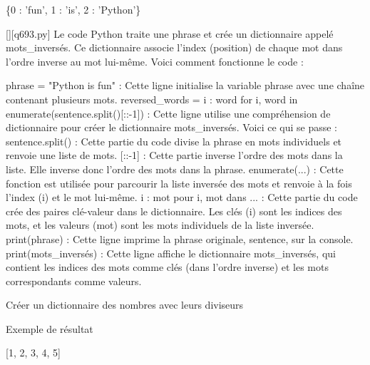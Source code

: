\{0 : 'fun', 1 : 'is', 2 : 'Python'\}
        \par
        \begin{solution}
            \renewcommand{\nomfichier}{q693.py}
            \pythonfile{\chemincode \nomfichier}[][\nomfichier]
            Le code Python traite une phrase et crée un dictionnaire appelé mots_inversés. Ce dictionnaire associe l'index (position) de chaque mot dans l'ordre inverse au mot lui-même. Voici comment fonctionne le code :

    phrase = "Python is fun" : Cette ligne initialise la variable phrase avec une chaîne contenant plusieurs mots.
    reversed_words = {i : word for i, word in enumerate(sentence.split()[::-1])} : Cette ligne utilise une compréhension de dictionnaire pour créer le dictionnaire mots_inversés. Voici ce qui se passe :
        sentence.split() : Cette partie du code divise la phrase en mots individuels et renvoie une liste de mots.
        [::-1] : Cette partie inverse l'ordre des mots dans la liste. Elle inverse donc l'ordre des mots dans la phrase.
        enumerate(...) : Cette fonction est utilisée pour parcourir la liste inversée des mots et renvoie à la fois l'index (i) et le mot lui-même.
        {i : mot pour i, mot dans ...} : Cette partie du code crée des paires clé-valeur dans le dictionnaire. Les clés (i) sont les indices des mots, et les valeurs (mot) sont les mots individuels de la liste inversée.
    print(phrase) : Cette ligne imprime la phrase originale, sentence, sur la console.
    print(mots_inversés) : Cette ligne affiche le dictionnaire mots_inversés, qui contient les indices des mots comme clés (dans l'ordre inverse) et les mots correspondants comme valeurs.
        \end{solution}
        

        \question
        Créer un dictionnaire des nombres avec leurs diviseurs

Exemple de résultat

[1, 2, 3, 4, 5]

